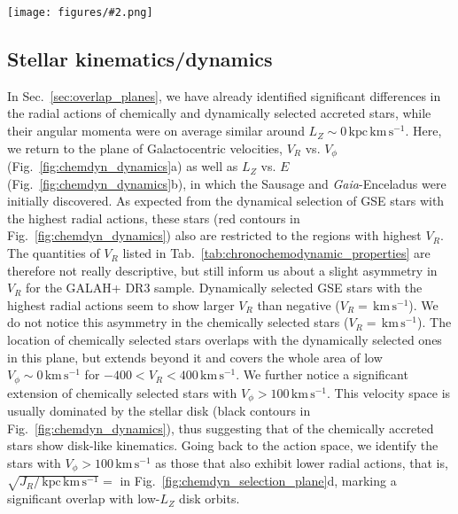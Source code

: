 \documentclass[fleqn,usenatbib]{mnras}
\newcommand{\kms}{\,\mathrm{km\,s^{-1}}}	%
\newcommand{\kpckms}{\,\mathrm{kpc\,km\,s^{-1}}}	%
\newcommand{\Gaia}{\textit{Gaia}\xspace} %
\newcommand{\codeicon}{{\faCloudDownload}}
\newcommand{\codelink}[1]{\href{https://github.com/svenbuder/Accreted-stars-in-GALAH-DR3/tree/main/figures/#1.ipynb}{\codeicon}\,\,}
\newcommand{\oscaption}[2]{\caption{#2 \codelink{#1}}}
\newcommand{\figuretextwidth}[4]{\begin{figure*} \centering \texttt{[image: figures/\#2.png]}\oscaption{#3}{#4}\label{fig:#2} \end{figure*}}
\begin{document}
\figuretextwidth{17cm}{chemdyn_dynamics}{chronochemodynamic_comparison}{
\textbf{Comparison of kinematic properties (Galactocentric velocities $V_R$ vs. $V_\phi$) as well as dynamic properties ($L_Z$, $E$, and $e$) for stars selected as accreted ones by means of chemistry (orange) and dynamics (red).} Black contours/lines denote the overall GALAH+ DR3 sample (mainly disk stars).
}

\subsection{Stellar kinematics/dynamics} \label{sec:gse_stellar_dynamics}

In Sec.~\ref{sec:overlap_planes}, we have already identified significant differences in the radial actions of chemically and dynamically selected accreted stars, while their angular momenta were on average similar around $L_Z \sim 0 \kpckms$. Here, we return to the plane of Galactocentric velocities, $V_R$ vs. $V_\phi$ (Fig.~\ref{fig:chemdyn_dynamics}a) as well as $L_Z$ vs. $E$ (Fig.~\ref{fig:chemdyn_dynamics}b), in which the Sausage \citep{Belokurov2018} and \Gaia-Enceladus \citep{Helmi2018} were initially discovered. As expected from the dynamical selection of GSE stars with the highest radial actions, these stars (red contours in Fig.~\ref{fig:chemdyn_dynamics}) also are restricted to the regions with highest $V_R$. The quantities of $V_R$ listed in Tab.~\ref{tab:chronochemodynamic_properties} are therefore not really descriptive, but still inform us about a slight asymmetry in $V_R$ for the GALAH+ DR3 sample. Dynamically selected GSE stars with the highest radial actions seem to show larger $V_R$ than negative ($V_R=$$\kms$). We do not notice this asymmetry in the chemically selected stars ($V_R=$$\kms$). The location of chemically selected stars overlaps with the dynamically selected ones in this plane, but extends beyond it and covers the whole area of low $V_\phi \sim 0 \kms$ for $-400 < V_R < 400\kms$. We further notice a significant extension of  chemically selected stars with $V_\phi > 100 \kms$. This velocity space is usually dominated by the stellar disk (black contours in Fig.~\ref{fig:chemdyn_dynamics}), thus suggesting that  of the chemically accreted stars show disk-like kinematics. Going back to the action space, we identify the stars with $V_\phi > 100 \kms$ as those that also exhibit lower radial actions, that is, $\sqrt{J_R / \kpckms} = $ in Fig.~\ref{fig:chemdyn_selection_plane}d, marking a significant overlap with low-$L_Z$ disk orbits.
\end{document}
